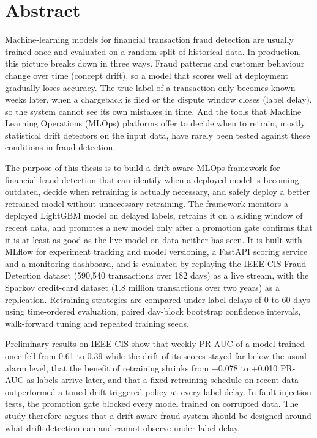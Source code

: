 \documentclass[12pt,a4paper]{report}
\begin{document}
\chapter*{Abstract}
Machine-learning models for financial transaction fraud detection are usually trained once and evaluated on a random split of historical data. In production, this picture breaks down in three ways. Fraud patterns and customer behaviour change over time (concept drift), so a model that scores well at deployment gradually loses accuracy. The true label of a transaction only becomes known weeks later, when a chargeback is filed or the dispute window closes (label delay), so the system cannot see its own mistakes in time. And the tools that Machine Learning Operations (MLOps) platforms offer to decide when to retrain, mostly statistical drift detectors on the input data, have rarely been tested against these conditions in fraud detection.

The purpose of this thesis is to build a drift-aware MLOps framework for financial fraud detection that can identify when a deployed model is becoming outdated, decide when retraining is actually necessary, and safely deploy a better retrained model without unnecessary retraining. The framework monitors a deployed LightGBM model on delayed labels, retrains it on a sliding window of recent data, and promotes a new model only after a promotion gate confirms that it is at least as good as the live model on data neither has seen. It is built with MLflow for experiment tracking and model versioning, a FastAPI scoring service and a monitoring dashboard, and is evaluated by replaying the IEEE-CIS Fraud Detection dataset (590,540 transactions over 182 days) as a live stream, with the Sparkov credit-card dataset (1.8 million transactions over two years) as a replication. Retraining strategies are compared under label delays of 0 to 60 days using time-ordered evaluation, paired day-block bootstrap confidence intervals, walk-forward tuning and repeated training seeds.

Preliminary results on IEEE-CIS show that weekly PR-AUC of a model trained once fell from 0.61 to 0.39 while the drift of its scores stayed far below the usual alarm level, that the benefit of retraining shrinks from +0.078 to +0.010 PR-AUC as labels arrive later, and that a fixed retraining schedule on recent data outperformed a tuned drift-triggered policy at every label delay. In fault-injection tests, the promotion gate blocked every model trained on corrupted data. The study therefore argues that a drift-aware fraud system should be designed around what drift detection can and cannot observe under label delay.
\end{document}

